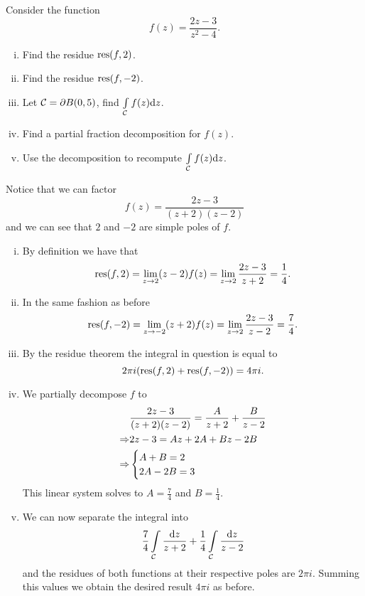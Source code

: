\documentclass[12pt]{memoir}
\begin{document}
\begin{Ej}
    Consider the function 
    $$f(z)=\frac{2z-3}{z^2-4}.$$
    \begin{enumerate}[i)]
        \itemsep=-0.4em
        \item Find the residue $\operatorname*{res}(f,2)$.
        \item Find the residue $\operatorname*{res}(f,-2)$.
        \item Let $\mathcal{C}=\partial B(0,5)$, find $\int\limits_{\mathcal{C}} f(z)\dd z$. 
        \item Find a partial fraction decomposition for $f(z)$.
        \item Use the decomposition to recompute $\int\limits_{\mathcal{C}} f(z)\dd z$.
    \end{enumerate}
\end{Ej}

\begin{ptcbr}
    Notice that we can factor 
    $$f(z)=\frac{2z-3}{(z+2)(z-2)}$$
    and we can see that $2$ and $-2$ are simple poles of $f$.
    \begin{enumerate}[i)]
        \itemsep=-0.4em
        \item By definition we have that 
        $$\operatorname*{res}(f,2)=\lim_{z\to 2}(z-2)f(z)=\lim_{z\to 2}\frac{2z-3}{z+2}=\frac{1}{4}.$$
        \item In the same fashion as before
        $$\operatorname*{res}(f,-2)=\lim_{z\to -2}(z+2)f(z)=\lim_{z\to 2}\frac{2z-3}{z-2}=\frac{7}{4}.$$
        \item By the residue theorem the integral in question is equal to 
        $$2\pi i(\operatorname*{res}(f,2)+\operatorname*{res}(f,-2))=4\pi i.$$
        \item We partially decompose $f$ to 
        \begin{align*}
            &\frac{2z-3}{(z+2)(z-2)}=\frac{A}{z+2}+\frac{B}{z-2}\\    
            \Rightarrow&2z-3=Az+2A+Bz-2B\\
            \Rightarrow&\begin{cases}
                A+B=2\\
                2A-2B=3
            \end{cases}
        \end{align*}
        This linear system solves to $A=\frac{7}{4}$ and $B=\frac{1}{4}$. 
        \item We can now separate the integral into 
        $$\frac74\int\limits_{\mathcal{C}}\frac{\dd z}{z+2}+\frac14\int\limits_{\mathcal{C}}\frac{\dd z}{z-2}$$
        and the residues of both functions at their respective poles are $2\pi i$. Summing this values we obtain the desired result $4\pi i$ as before.
    \end{enumerate}
\end{ptcbr}
\end{document}
